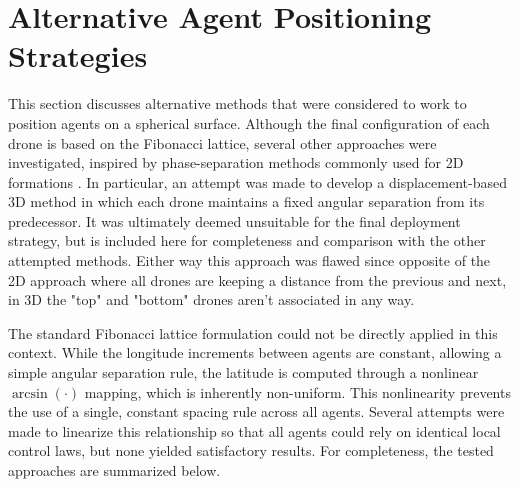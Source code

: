 \section{Alternative Agent Positioning Strategies} \label{annex:Alternative Agent Positioning Strategies}

This section discusses alternative methods that were considered to work to position agents on a spherical surface. Although the final configuration of each drone is based on the Fibonacci lattice, several other approaches were investigated, inspired by phase-separation methods commonly used for 2D formations \cite{Litimein2021,Jin2018,Kim2007}.  In particular, an attempt was made to develop a displacement-based 3D method in which each drone maintains a fixed angular separation from its predecessor. It was ultimately deemed unsuitable for the final deployment strategy, but is included here for completeness and comparison with the other attempted methods. Either way this approach was flawed since opposite of the 2D approach where all drones are keeping a distance from the previous and next, in 3D the "top" and "bottom" drones aren't associated in any way.

The standard Fibonacci lattice formulation could not be directly applied in this context. While the longitude increments between agents are constant, allowing a simple angular separation rule, the latitude is computed through a nonlinear $\arcsin(\cdot)$ mapping, which is inherently non-uniform. This nonlinearity prevents the use of a single, constant spacing rule across all agents. Several attempts were made to linearize this relationship so that all agents could rely on identical local control laws, but none yielded satisfactory results. For completeness, the tested approaches are summarized below.

